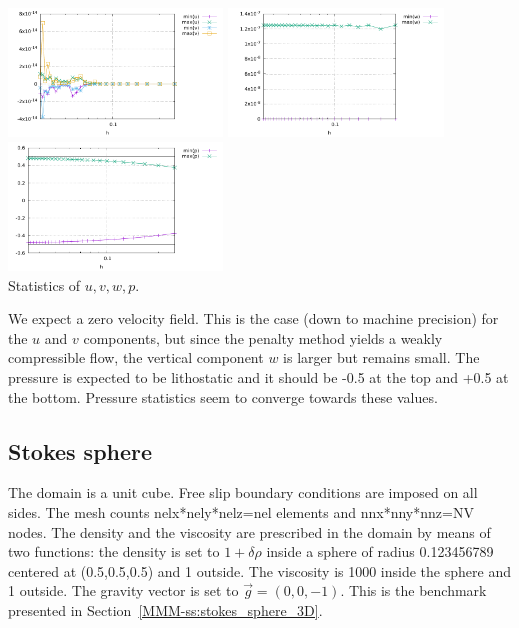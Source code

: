 \begin{center}
\includegraphics[width=5.7cm]{python_codes/fieldstone_10/results/exp0/stats_uv}
\includegraphics[width=5.7cm]{python_codes/fieldstone_10/results/exp0/stats_w}
\includegraphics[width=5.7cm]{python_codes/fieldstone_10/results/exp0/stats_p}\\
{\captionfont Statistics of $u,v,w,p$.}
\end{center}

We expect a zero velocity field. This is the case (down to machine precision) for the $u$
and $v$ components, but since the penalty method yields a weakly compressible flow, 
the vertical component $w$ is larger but remains small.
The pressure is expected to be lithostatic and it should be -0.5 at the top and +0.5 at 
the bottom. Pressure statistics seem to converge towards these values. 





\subsection*{Stokes sphere}

The domain is a unit cube. Free slip boundary conditions 
are imposed on all sides. The mesh counts 
nelx*nely*nelz=nel elements and 
nnx*nny*nnz=NV nodes.
The density and the viscosity are prescribed in the domain 
by means of two functions:
the density is set to $1+\delta \rho$ inside a sphere of radius 0.123456789 centered 
at (0.5,0.5,0.5) and 1 outside. The viscosity is 1000 inside the sphere
and 1 outside.  The gravity vector is set to $\vec{g}=(0,0,-1)$.
This is the benchmark presented in Section~\ref{MMM-ss:stokes_sphere_3D}.

